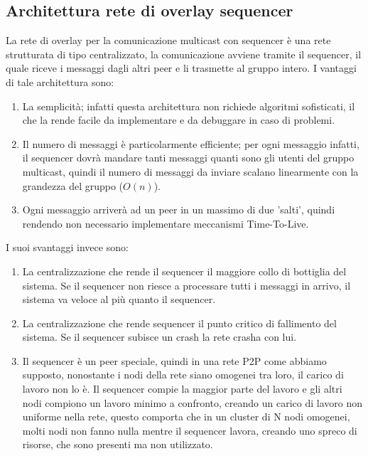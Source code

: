 \documentclass[conference]{IEEEtran}
\begin{document}
\subsection{Architettura rete di overlay sequencer}
La rete di overlay per la comunicazione multicast con sequencer è una rete
strutturata di tipo centralizzato, la comunicazione avviene tramite il
sequencer, il quale riceve i messaggi dagli altri peer e li trasmette al gruppo
intero.
I vantaggi di tale architettura sono:
\begin{enumerate}
\item La semplicità; infatti questa architettura non richiede algoritmi
  sofisticati, il che la rende facile da implementare e da debuggare in caso di problemi.
\item Il numero di messaggi è particolarmente efficiente; per ogni messaggio
  infatti, il sequencer dovrà mandare tanti messaggi quanti sono gli utenti
  del gruppo multicast, quindi il numero di messaggi da inviare scalano
  linearmente con la grandezza del gruppo (\(O(n)\)).
\item Ogni messaggio arriverà ad un peer in un massimo di due 'salti', quindi
  rendendo non necessario implementare meccanismi Time-To-Live.
\end{enumerate}
I suoi svantaggi invece sono:
\begin{enumerate}
  \item La centralizzazione che rende il sequencer il maggiore collo di
    bottiglia del sistema. Se il sequencer non riesce a processare tutti i
    messaggi in arrivo, il sistema va veloce al più quanto il sequencer.
  \item La centralizzazione che rende sequencer il punto critico di
    fallimento del sistema. Se il sequencer subisce un crash la rete crasha con
    lui.
  \item Il sequencer è un peer speciale, quindi in una rete P2P come abbiamo
    supposto, nonostante i nodi della rete siano omogenei tra loro, il carico di
    lavoro non lo è. Il sequencer compie la maggior parte del lavoro e gli altri
    nodi compiono un lavoro minimo a confronto, creando un carico di lavoro
    non uniforme nella rete, questo comporta che in un cluster di N nodi
    omogenei, molti nodi non fanno nulla mentre il sequencer lavora, creando uno
    spreco di risorse, che sono presenti ma non utilizzato.
  \end{enumerate}
\end{document}
